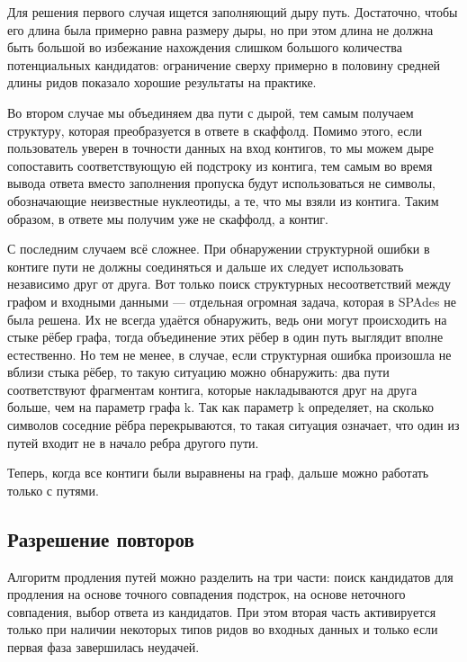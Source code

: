 \documentclass[14pt]{matmex-diploma-custom}
\begin{document}
Для решения первого случая ищется заполняющий дыру путь. Достаточно, чтобы его длина была примерно равна размеру дыры, но при этом длина не должна быть большой во избежание нахождения слишком большого количества потенциальных кандидатов: ограничение сверху примерно в половину средней длины ридов показало хорошие результаты на практике.

Во втором случае мы объединяем два пути с дырой, тем самым получаем структуру, которая преобразуется в ответе в скаффолд. Помимо этого, если пользователь уверен в точности данных на вход контигов, то мы можем дыре сопоставить соответствующую ей подстроку из контига, тем самым во время вывода ответа вместо заполнения пропуска будут использоваться не символы, обозначающие неизвестные нуклеотиды, а те, что мы взяли из контига. Таким образом, в ответе мы получим уже не скаффолд, а контиг. 

С последним случаем всё сложнее. При обнаружении структурной ошибки в контиге пути не должны соединяться и дальше их следует использовать независимо друг от друга. Вот только поиск структурных несоответствий между графом и входными данными --- отдельная огромная задача, которая в SPAdes не была решена. Их не всегда удаётся обнаружить, ведь они могут происходить на стыке рёбер графа, тогда объединение этих рёбер в один путь выглядит вполне естественно. Но тем не менее, в случае, если структурная ошибка произошла не вблизи стыка рёбер, то такую ситуацию можно обнаружить: два пути соответствуют фрагментам контига, которые накладываются друг на друга больше, чем на параметр графа k. Так как параметр k определяет, на сколько символов соседние рёбра перекрываются, то такая ситуация означает, что один из путей входит не в начало ребра другого пути.

Теперь, когда все контиги были выравнены на граф, дальше можно работать только с путями. 

\subsection{Разрешение повторов}
Алгоритм продления путей можно разделить на три части: поиск кандидатов для продления на основе точного совпадения подстрок, на основе неточного совпадения, выбор ответа из кандидатов. При этом вторая часть активируется только при наличии некоторых типов ридов во входных данных и только если первая фаза завершилась неудачей.
\end{document}
